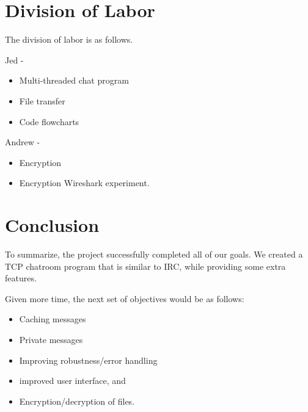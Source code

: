 \documentclass{article}
\begin{document}

\section{Division of Labor}

The division of labor is as follows.

Jed - 
\begin{itemize}
  \item Multi-threaded chat program
  \item File transfer
  \item Code flowcharts
\end{itemize}

Andrew - 
\begin{itemize}
  \item Encryption
  \item Encryption Wireshark experiment. 
\end{itemize}

\section{Conclusion}

To summarize, the project successfully completed all of our goals. We created a TCP chatroom program that is similar to IRC, while providing some extra features. 

Given more time, the next set of objectives would be as follows: 
\begin{itemize}
  \item Caching messages
  \item Private messages
  \item Improving robustness/error handling
  \item improved user interface, and
  \item Encryption/decryption of files. 
\end{itemize}





\end{document}
